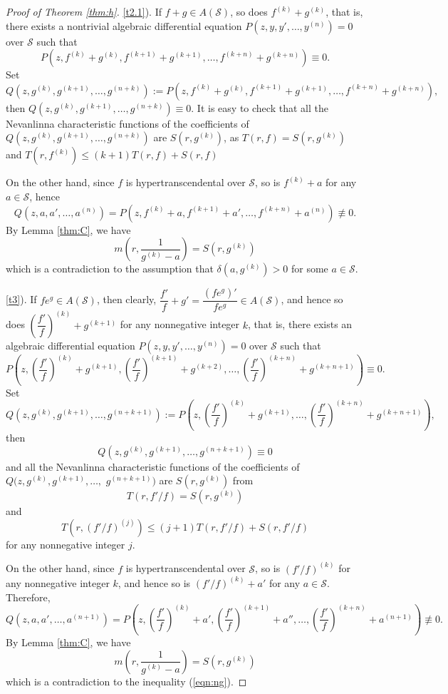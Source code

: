\documentclass[reqno,12pt]{amsart}
\begin{document}
\begin{proof}[Proof of Theorem \ref{thm:h}]
\ref{t2.1}). If $f+g \in A(\mathcal{S})$, so does $f^{(k)}+g^{(k)}$, that is, there exists a nontrivial algebraic differential equation $P(z, y, y', \dots, y^{(n)})=0$ over $\mathcal{S}$ such that $$P(z, f^{(k)}+g^{(k)}, f^{(k+1)}+g^{(k+1)}, \dots, f^{(k+n)}+g^{(k+n)})\equiv 0.$$ Set $$Q(z, g^{(k)}, g^{(k+1)}, \dots, g^{(n+k)}):=P(z, f^{(k)}+g^{(k)}, f^{(k+1)}+g^{(k+1)}, \dots, f^{(k+n)}+g^{(k+n)}),$$ 
then $Q(z, g^{(k)}, g^{(k+1)}, \dots, g^{(n+k)})\equiv 0$. It is easy to check that all the Nevanlinna characteristic functions of the coefficients of $Q(z, g^{(k)}, g^{(k+1)}, \dots, g^{(n+k)})$ are $S(r, g^{(k)})$, as $T(r, f)=S(r, g^{(k)})$ and $T(r, f^{(k)})\leq (k+1)T(r, f)+S(r, f)$

On the other hand,  since $f$ is hypertranscendental over $\mathcal{S}$, so is $f^{(k)}+a$ for any $a\in\mathcal{S}$, hence $$Q(z, a, a' , \dots, a^{(n)})=P(z, f^{(k)}+a, f^{(k+1)}+a', \dots, f^{(k+n)}+a^{(n)})\not\equiv 0.$$ By Lemma \ref{thm:C}, we have $$m\left(r, \frac{1}{g^{(k)}-a}\right)=S(r, g^{(k)})$$ which is a contradiction to the assumption that $\delta(a, g^{(k)})>0$ for some $a\in\mathcal{S}$. 

\ref{t3}).  If $fe^g\in A(\mathcal{S})$, then clearly, $\dfrac{f'}{f}+g'=\dfrac{(fe^g)'}{fe^g}\in A(\mathcal{S})$, and hence so does $\left(\dfrac{f'}{f}\right)^{(k)}+g^{(k+1)}$ for any nonnegative integer $k$, 
that is, there exists an algebraic differential equation $P(z, y, y', \dots, y^{(n)})=0$ over $\mathcal{S}$ such that 
$$P\left(z, \left(\dfrac{f'}{f}\right)^{(k)}+g^{(k+1)}, \left(\dfrac{f'}{f}\right)^{(k+1)}+g^{(k+2)}, \dots,\left(\dfrac{f'}{f}\right)^{(k+n)}+g^{(k+n+1)}\right)\equiv 0.$$ 
Set $$Q(z, g^{(k)}, g^{(k+1)}, \dots, g^{(n+k+1)}):=P\left(z, \left(\dfrac{f'}{f}\right)^{(k)}+g^{(k+1)},  \dots,\left(\dfrac{f'}{f}\right)^{(k+n)}+g^{(k+n+1)}\right),$$ then $$Q(z, g^{(k)}, g^{(k+1)}, \dots, g^{(n+k+1)})\equiv 0$$ 
and all the Nevanlinna characteristic functions of the coefficients of $Q(z, g^{(k)}, g^{(k+1)}, \dots,$ $g^{(n+k+1)})$ are $S(r, g^{(k)})$ from $$T(r, f'/f)=S(r, g^{(k)})$$ and $$T(r, (f'/f)^{(j)})\leq(j+1)T(r, f'/f)+S(r, f'/f)$$ for any nonnegative integer $j$.

On the other hand, since $f$ is hypertranscendental over $\mathcal{S}$, so is $(f'/f)^{(k)}$ for any nonnegative integer $k$, and hence so is $(f'/f)^{(k)}+a'$ for any $a\in\mathcal{S}$. Therefore, $$Q(z, a, a' ,\dots, a^{(n+1)})=P\left(z, \left(\dfrac{f'}{f}\right)^{(k)}+a', \left(\dfrac{f'}{f}\right)^{(k+1)}+a'', \dots,\left(\dfrac{f'}{f}\right)^{(k+n)}+a^{(n+1)}\right)\not\equiv 0.$$ By Lemma \ref{thm:C}, we have $$m\left(r, \frac{1}{g^{(k)}-a}\right)=S(r, g^{(k)})$$ which is a contradiction to the inequality (\ref{eqn:ng}).  




\end{proof}
\end{document}
